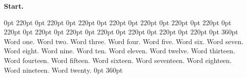 \documentclass[a4paper,11pt]{article}
\begin{document}
\vspace*{3cm}
\noindent\textbf{Start.}\par
{} 0pt 220pt 0pt 220pt 0pt 220pt 0pt 220pt 0pt 220pt 0pt 220pt 0pt 220pt 0pt 220pt 0pt 220pt 0pt 220pt 0pt 220pt 0pt 220pt 0pt 220pt 0pt 220pt 0pt 360pt
Word one. Word two. Word three. Word four. Word five. Word six. Word seven. Word eight. Word nine. Word ten.
Word eleven. Word twelve. Word thirteen. Word fourteen. Word fifteen.
Word sixteen. Word seventeen. Word eighteen. Word nineteen. Word twenty.
 0pt 360pt
\end{document}
